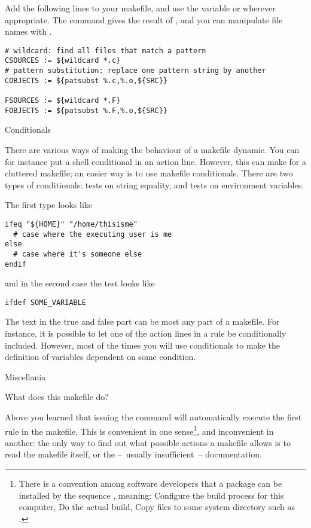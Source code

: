 Add the following lines
to your makefile, and use the variable  or 
wherever appropriate.
The command  gives the result of ,
and you can manipulate file names with .
\begin{verbatim}
# wildcard: find all files that match a pattern
CSOURCES := ${wildcard *.c}
# pattern substitution: replace one pattern string by another
COBJECTS := ${patsubst %.c,%.o,${SRC}}

FSOURCES := ${wildcard *.F}
FOBJECTS := ${patsubst %.F,%.o,${SRC}}
\end{verbatim}

 {Conditionals}

There are various ways of making the behaviour of a makefile dynamic.
You can for instance put a shell conditional in an action line.
However, this can make for a cluttered makefile; an easier way is to use
makefile conditionals. There are two types of conditionals: tests on string
equality, and tests on environment variables.

The first type looks like
\begin{verbatim}
ifeq "${HOME}" "/home/thisisme"
  # case where the executing user is me
else
  # case where it's someone else
endif
\end{verbatim}
and in the second case the test looks like
\begin{verbatim}
ifdef SOME_VARIABLE
\end{verbatim}
The text in the true and false part can be most any part of a
makefile. For instance, it is possible to let one of the action lines
in a rule be conditionally included. However, most of the times you
will use conditionals to make the definition of variables dependent on
some condition.


 {Miscellania}

 {What does this makefile do?}

Above you learned that issuing the  command will automatically
execute the first rule in the makefile. This is convenient in one
sense\footnote {There is a convention among software developers that a
  package can be installed by the sequence , meaning: Configure the build process for this
  computer, Do the actual build, Copy files to some system directory
  such as .}, and inconvenient in another: the only way to
find out what possible actions a makefile allows is to read the
makefile itself, or the --~usually insufficient~-- documentation.

